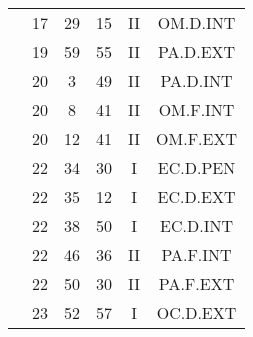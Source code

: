\documentclass[12pt, a4paper]{article}
\begin{document}
\begin{multicols}{3}
{\begin{tabular}{c c c c c c}
	 	 	 	 & 17 & 29 & 15 & II & OM.D.INT\\%
	 	 	 	 & 19 & 59 & 55 & II & PA.D.EXT\\%
	 	 	 	 & 20 & 3 & 49 & II & PA.D.INT\\%
	 	 	 	 & 20 & 8 & 41 & II & OM.F.INT\\%
	 	 	 	 & 20 & 12 & 41 & II & OM.F.EXT\\%
	 	 	 	 & 22 & 34 & 30 & I & EC.D.PEN\\%
	 	 	 	 & 22 & 35 & 12 & I & EC.D.EXT\\%
	 	 	 	 & 22 & 38 & 50 & I & EC.D.INT\\%
	 	 	 	 & 22 & 46 & 36 & II & PA.F.INT\\%
	 	 	 	 & 22 & 50 & 30 & II & PA.F.EXT\\%
	 	 	 	 & 23 & 52 & 57 & I & OC.D.EXT\\%
	 	 \end{tabular}
 	}
\end{multicols}
\end{document}

